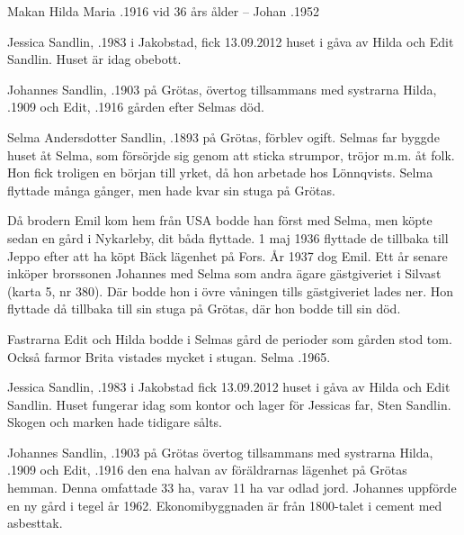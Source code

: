 Makan Hilda Maria .1916 vid 36 års ålder  --  Johan .1952




Jessica Sandlin, .1983  i Jakobstad, fick 13.09.2012 huset i gåva av Hilda och Edit Sandlin. Huset är idag obebott.


Johannes Sandlin, .1903 på Grötas, övertog tillsammans med systrarna Hilda, .1909 och Edit, .1916 gården efter Selmas död.


Selma  Andersdotter Sandlin, .1893 på Grötas, förblev ogift. Selmas far byggde huset åt Selma, som försörjde sig genom att sticka strumpor, tröjor m.m. åt folk. Hon fick troligen en början till yrket, då hon arbetade hos Lönnqvists. Selma flyttade många gånger, men hade kvar sin stuga på Grötas.


Då brodern Emil kom hem från USA bodde han först med Selma, men köpte sedan en gård i Nykarleby, dit båda flyttade. 1 maj 1936 flyttade de tillbaka till Jeppo efter att ha köpt Bäck lägenhet på Fors. År 1937 dog Emil. Ett år senare inköper brorssonen Johannes med Selma som andra ägare gästgiveriet i Silvast (karta 5, nr 380). Där bodde hon i övre våningen tills gästgiveriet lades ner. Hon flyttade då tillbaka till sin stuga på Grötas, där hon bodde till sin död.

Fastrarna Edit och Hilda bodde i Selmas gård de perioder som gården stod tom. Också farmor Brita vistades mycket i stugan. Selma .1965.




Jessica Sandlin, .1983 i Jakobstad fick 13.09.2012 huset i gåva av Hilda och Edit Sandlin. Huset fungerar idag som kontor och lager för Jessicas far, Sten Sandlin. Skogen och marken hade tidigare sålts.


Johannes Sandlin, .1903 på Grötas övertog tillsammans med systrarna Hilda, .1909 och Edit, .1916 den ena halvan av föräldrarnas lägenhet på Grötas hemman. Denna omfattade 33 ha, varav 11 ha var odlad jord. Johannes uppförde en ny gård i tegel år 1962. Ekonomibyggnaden är från 1800-talet i cement med asbesttak.

